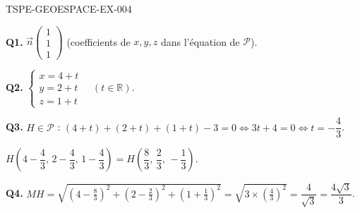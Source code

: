 \begin{corrige}{TSPE-GEOESPACE-EX-004}

\textbf{Q1.} $\vec{n}\begin{pmatrix}1\\1\\1\end{pmatrix}$ (coefficients de $x,y,z$ dans l'équation de $\mathcal{P}$).

\textbf{Q2.} $\begin{cases}x=4+t\\y=2+t\\z=1+t\end{cases}\quad(t\in\mathbb{R})$.

\textbf{Q3.} $H \in \mathcal{P}$ : $(4+t)+(2+t)+(1+t)-3=0 \iff 3t+4=0 \iff t=-\dfrac{4}{3}$.

$H\left(4-\dfrac{4}{3},\,2-\dfrac{4}{3},\,1-\dfrac{4}{3}\right) = H\left(\dfrac{8}{3},\,\dfrac{2}{3},\,-\dfrac{1}{3}\right)$.

\textbf{Q4.} $MH = \sqrt{\left(4-\frac{8}{3}\right)^2+\left(2-\frac{2}{3}\right)^2+\left(1+\frac{1}{3}\right)^2} = \sqrt{3\times\left(\frac{4}{3}\right)^2} = \dfrac{4}{\sqrt{3}} = \dfrac{4\sqrt{3}}{3}$.

\end{corrige}
